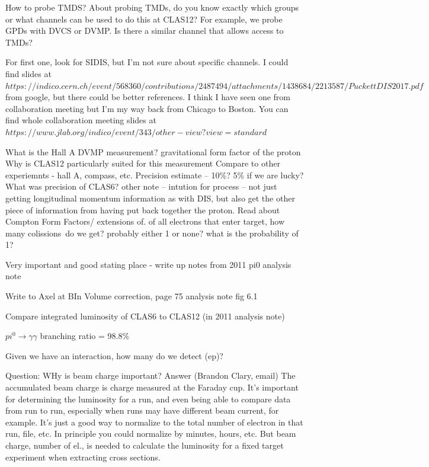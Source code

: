         How to probe TMDS?
        About probing TMDs, do you know exactly which groups or what channels can be used to do this at CLAS12? For example, we probe GPDs with DVCS or DVMP. Is there a similar channel that allows access to TMDs?
        
        For first one, look for SIDIS, but I'm not sure about specific channels. I could find slides at
        $https://indico.cern.ch/event/568360/contributions/2487494/attachments/1438684/2213587/PuckettDIS2017.pdf$ from google, but there could be better references. I think I have seen one from collaboration meeting but I'm my way back from Chicago to Boston. You can find whole collaboration meeting slides at $https://www.jlab.org/indico/event/343/other-view?view=standard$



    What is the Hall A DVMP measurement?
    gravitational form factor of the proton
    Why is CLAS12 particularly suited for this measurement
    Compare to other experiemnts - hall A, compass, etc. 
    Precision estimate – 10\%? 5\% if we are lucky? What was precision of CLAS6?
    other note – intution for process – not just getting longitudinal momentum information as with DIS, but also get the other piece of information from having put back together the proton. Read about Compton Form Factors/ extensions of. 
    of all electrons that enter target, how many colissions do we get? probably either 1 or none? what is the probability of 1?
    
    Very important and good stating place - write up notes from 2011 pi0 analysis note
    
    Write to Axel at BIn Volume correction, page 75 analysis note fig 6.1
    
    Compare integrated luminosity of CLAS6 to CLAS12 (in 2011 analysis note)
    
    $pi^0 \longrightarrow \gamma \gamma$ branching ratio = 98.8\%
    
    Given we have an interaction, how many do we detect (ep)?
    
    Question: WHy is beam charge important?
    Answer (Brandon Clary, email) The accumulated beam charge is charge measured at the Faraday cup. It's important for determining the luminosity for a run, and even being able to compare data from run to run, especially when runs may have different beam current, for example. It's just a good way to normalize to the total number of electron in that run, file, etc. In principle you could normalize by minutes, hours, etc. But beam charge, number of el., is needed to calculate the luminosity for a fixed target experiment when extracting cross sections.


